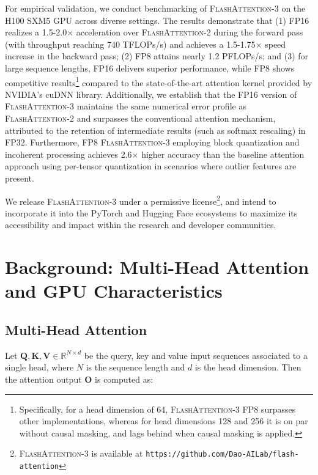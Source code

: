 For empirical validation, we conduct benchmarking of \textsc{FlashAttention-3} on the H100 SXM5 GPU across diverse settings. The results demonstrate that (1) FP16 realizes a 1.5-2.0$\times$ acceleration over \textsc{FlashAttention-2} during the forward pass (with throughput reaching 740 TFLOPs/s) and achieves a 1.5-1.75$\times$ speed increase in the backward pass; (2) FP8 attains nearly 1.2 PFLOPs/s; and (3) for large sequence lengths, FP16 delivers superior performance, while FP8 shows competitive results\footnote{Specifically, for a head dimension of 64, \textsc{FlashAttention-3} FP8 surpasses other implementations, whereas for head dimensions 128 and 256 it is on par without causal masking, and lags behind when causal masking is applied.} compared to the state-of-the-art attention kernel provided by NVIDIA’s cuDNN library. Additionally, we establish that the FP16 version of \textsc{FlashAttention-3} maintains the same numerical error profile as \textsc{FlashAttention-2} and surpasses the conventional attention mechanism, attributed to the retention of intermediate results (such as softmax rescaling) in FP32. Furthermore, FP8 \textsc{FlashAttention-3} employing block quantization and incoherent processing achieves 2.6$\times$ higher accuracy than the baseline attention approach using per-tensor quantization in scenarios where outlier features are present.

We release \textsc{FlashAttention-3} under a permissive license\footnote{\textsc{FlashAttention-3}
  is available at \texttt{https://github.com/Dao-AILab/flash-attention}}, and intend to incorporate it into the PyTorch and Hugging Face ecosystems to maximize its accessibility and impact within the research and developer communities.

\section{Background: Multi-Head Attention and GPU Characteristics}
\label{sec:background}

\subsection{Multi-Head Attention}
\label{subsec:multi_head_attn}

Let $\mathbf{Q}, \mathbf{K}, \mathbf{V} \in \mathbb{R}^{N \times d}$ be the query, key and value input sequences associated to a single head, where $N$ is the sequence length and $d$ is the head dimension. Then the attention output $\mathbf{O}$ is computed as:

